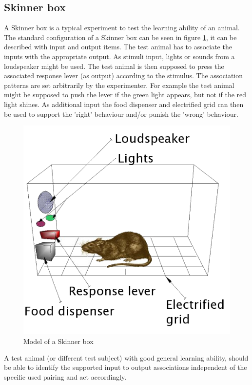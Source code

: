 \documentclass[12pt,twoside]{article}
\theoremstyle{plain}
\theoremstyle{definition}
\theoremstyle{remark}
\begin{document}
\subsection{Skinner box}
\label{skinner}
A Skinner box is a typical experiment to test the learning ability of an animal.
The standard configuration of a Skinner box can be seen in figure \ref{fig:skinner}, it can be described with input and output items.
The test animal has to associate the inputs with the appropriate output.
As stimuli input, lights or sounds from a loudspeaker might be used. The test animal is then supposed to press the associated response lever (as output) according to the stimulus.
The association patterns are set arbitrarily by the experimenter. For example the test animal might be supposed to push the lever if the green light appears, but not if the red light shines.
As additional input the food dispenser and electrified grid can then be used to support the 'right' behaviour and/or punish the 'wrong' behaviour.

\begin{figure}[h]
	\begin{center}
		\includegraphics[width=.43\textwidth]{Skinner_box_scheme_01.png}
	\end{center}
	\vspace*{-0.5cm}
	\caption[Model of a Skinner box]{Model of a Skinner box \footnotemark}
	\label{fig:skinner}
\end{figure}

A test animal (or different test subject) with good general learning ability, should be able to identify the supported input to output associations independent of the specific used pairing and act accordingly.
\end{document}
